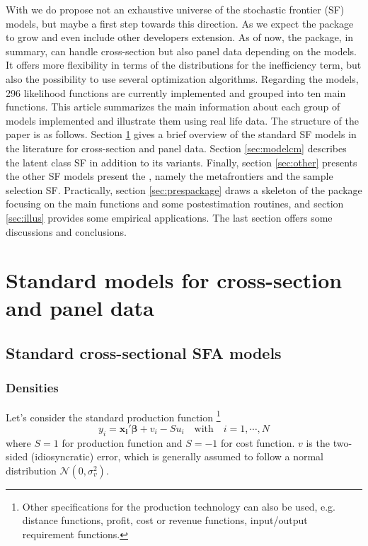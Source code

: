 \documentclass[nojss]{jss}
\begin{document}
With  we do propose not an exhaustive universe of the 
stochastic frontier (SF) models, but maybe a first step towards this direction. 
As we expect the package to grow and even include other developers extension. As of
now, the package, in summary, can handle cross-section but also panel data depending on the 
models. It offers more flexibility in terms of the distributions for the 
inefficiency term, but also the possibility to use several optimization 
algorithms. Regarding the models, 296 likelihood functions are currently 
implemented and grouped into ten main functions. This article summarizes the main information 
about each group of models implemented and illustrate them using real life data.
The structure of the paper is as follows. Section \ref{sec:modelstandar} gives 
a brief overview of the standard SF models in the literature for cross-section
and panel data. Section \ref{sec:modelcm} describes the latent class SF in
addition to its variants. Finally, section \ref{sec:other} presents the other 
SF models present the , namely the metafrontiers and the sample 
selection SF. Practically, section \ref{sec:prespackage} draws a skeleton
of the  package focusing on the main functions and some postestimation
routines, and section \ref{sec:illus} provides some empirical applications. The
last section offers some discussions and conclusions.

\section{Standard models for cross-section and panel data} \label{sec:modelstandar}

\subsection{Standard cross-sectional SFA models}

\subsubsection{Densities}

Let's consider the standard production function \footnote{Other specifications 
for the production technology can also be used, e.g. distance functions, profit,
cost or revenue functions, input/output requirement functions.} 
%
\begin{equation}\label{eq:1.1.1}
y_i = \mathbf{x_i'}\bm{\beta} + v_i - Su_i \quad \text{with} \quad i = 1, \cdots, N
\end{equation}
%
where $S = 1$ for production function and $S = -1$ for cost function. $v$ is the 
two-sided (idiosyncratic) error, which is generally assumed to follow a normal distribution 
$\mathcal{N}(0, \sigma_v^2)$. 
\end{document}
